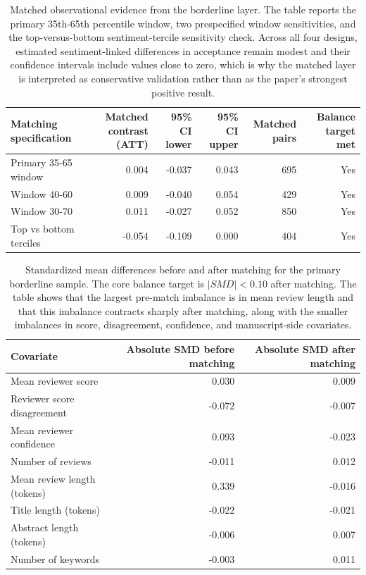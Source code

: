 \begin{table}[!htbp]
\centering
\begingroup
\small
\renewcommand{\arraystretch}{1.20}
\setlength{\tabcolsep}{6pt}
\caption{Matched observational evidence from the borderline layer. The table reports the primary 35th-65th percentile window, two prespecified window sensitivities, and the top-versus-bottom sentiment-tercile sensitivity check. Across all four designs, estimated sentiment-linked differences in acceptance remain modest and their confidence intervals include values close to zero, which is why the matched layer is interpreted as conservative validation rather than as the paper's strongest positive result.}
\label{tab:app:matchingeffects}
\begin{tabular}{lrrrrr}
\toprule
Matching specification & Matched contrast (ATT) & 95\% CI lower & 95\% CI upper & Matched pairs & Balance target met \\
\midrule
Primary 35-65 window & 0.004 & -0.037 & 0.043 & 695 & Yes \\
Window 40-60 & 0.009 & -0.040 & 0.054 & 429 & Yes \\
Window 30-70 & 0.011 & -0.027 & 0.052 & 850 & Yes \\
Top vs bottom terciles & -0.054 & -0.109 & 0.000 & 404 & Yes \\
\bottomrule
\end{tabular}
\endgroup
\end{table}

\begin{table}[!htbp]
\centering
\begingroup
\normalsize
\renewcommand{\arraystretch}{1.20}
\setlength{\tabcolsep}{6pt}
\caption{Standardized mean differences before and after matching for the primary borderline sample. The core balance target is $|SMD| < 0.10$ after matching. The table shows that the largest pre-match imbalance is in mean review length and that this imbalance contracts sharply after matching, along with the smaller imbalances in score, disagreement, confidence, and manuscript-side covariates.}
\label{tab:app:balance}
\begin{tabular}{lrr}
\toprule
Covariate & Absolute SMD before matching & Absolute SMD after matching \\
\midrule
Mean reviewer score & 0.030 & 0.009 \\
Reviewer score disagreement & -0.072 & -0.007 \\
Mean reviewer confidence & 0.093 & -0.023 \\
Number of reviews & -0.011 & 0.012 \\
Mean review length (tokens) & 0.339 & -0.016 \\
Title length (tokens) & -0.022 & -0.021 \\
Abstract length (tokens) & -0.006 & 0.007 \\
Number of keywords & -0.003 & 0.011 \\
\bottomrule
\end{tabular}
\endgroup
\end{table}

